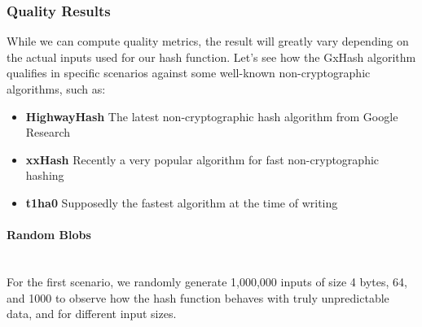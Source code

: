 \documentclass[10pt]{article}
\begin{document}
\subsubsection{Quality Results}

While we can compute quality metrics, the result will greatly vary depending on the actual inputs used for our hash function. Let's see how the GxHash algorithm qualifies in specific scenarios against some well-known non-cryptographic algorithms, such as:

\begin{itemize}
\item \textbf{HighwayHash}\cite{highwayhash} The latest non-cryptographic hash algorithm from Google Research
\item \textbf{xxHash}\cite{xxhash} Recently a very popular algorithm for fast non-cryptographic hashing
\item \textbf{t1ha0}\cite{rust-t1ha} Supposedly the fastest algorithm at the time of writing
\end{itemize}

\clearpage
\paragraph{Random Blobs}\leavevmode\\
For the first scenario, we randomly generate 1,000,000 inputs of size 4 bytes, 64, and 1000 to observe how the hash function behaves with truly unpredictable data, and for different input sizes.
\end{document}
